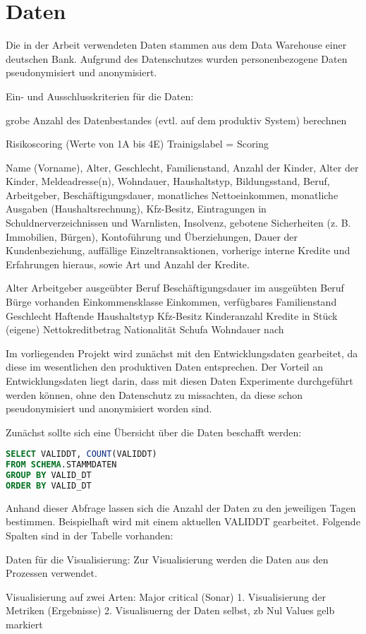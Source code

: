\chapter{Daten}\label{ch:data}

Die in der Arbeit verwendeten Daten stammen aus dem Data Warehouse einer deutschen Bank.
Aufgrund des Datenschutzes wurden personenbezogene Daten pseudonymisiert und anonymisiert.

Ein- und Ausschlusskriterien für die Daten:



grobe Anzahl des Datenbestandes (evtl. auf dem produktiv System) berechnen


Risikoscoring (Werte von 1A bis 4E)
Trainigslabel = Scoring


 Name (Vorname), Alter, Geschlecht, Familienstand, Anzahl der Kinder,
Alter der Kinder, Meldeadresse(n), Wohndauer, Haushaltstyp, Bildungsstand, Beruf, Arbeitgeber, Beschäftigungsdauer, monatliches Nettoeinkommen, monatliche Ausgaben (Haushaltsrechnung), Kfz-Besitz, Eintragungen in Schuldnerverzeichnissen und Warnlisten, Insolvenz, gebotene Sicherheiten (z. B. Immobilien, Bürgen), Kontoführung und Überziehungen, Dauer der Kundenbeziehung, auffällige Einzeltransaktionen, vorherige interne
Kredite und Erfahrungen hieraus, sowie Art und Anzahl der Kredite. 



Alter
Arbeitgeber
ausgeübter Beruf
Beschäftigungsdauer im ausgeübten Beruf
Bürge vorhanden
Einkommensklasse
Einkommen, verfügbares
Familienstand
Geschlecht
Haftende
Haushaltstyp
Kfz-Besitz
Kinderanzahl
Kredite in Stück (eigene)
Nettokreditbetrag
Nationalität
Schufa
Wohndauer
nach 
\cite{sokol2005}


Im vorliegenden Projekt wird zunächst mit den Entwicklungsdaten gearbeitet, da diese im wesentlichen den produktiven Daten entsprechen.
Der Vorteil an Entwicklungsdaten liegt darin, dass mit diesen Daten Experimente durchgeführt werden können, ohne den Datenschutz zu missachten, da diese schon pseudonymisiert und anonymisiert worden sind. 

Zunächst sollte sich eine Übersicht über die Daten beschafft werden:


\begin{lstlisting}[language=SQL,caption={Überblick über die Daten},captionpos=b]
SELECT VALIDDT, COUNT(VALIDDT) 
FROM SCHEMA.STAMMDATEN 
GROUP BY VALID_DT 
ORDER BY VALID_DT
\end{lstlisting}
Anhand dieser Abfrage lassen sich die Anzahl der Daten zu den jeweiligen Tagen bestimmen. 
Beispielhaft wird mit einem aktuellen VALIDDT gearbeitet. 
Folgende Spalten sind in der Tabelle vorhanden:



Daten für die Visualisierung:
Zur Visualisierung werden die Daten aus den Prozessen verwendet. 


Visualisierung auf zwei Arten: Major critical (Sonar)
1. Visualisierung der Metriken (Ergebnisse)
2. Visualisuerng der Daten selbst, zb Nul Values gelb markiert
